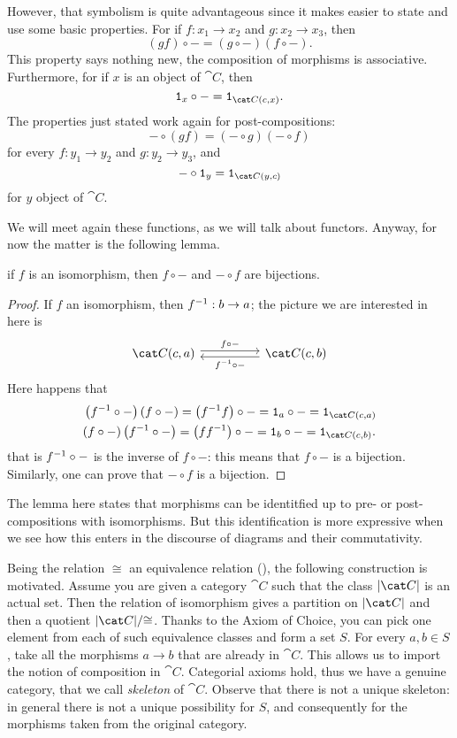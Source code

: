 However, that symbolism is quite advantageous since it makes easier to
state and use some basic properties. For if \(f : x_1 \to x_2\) and
\(g : x_2 \to x_3\), then
\[(gf) \circ - = (g \circ -) (f \circ -) .\] This property says nothing new, the
composition of morphisms is associative. Furthermore, for if \(x\) is
an object of \(\cat C\), then
\[\id_x \circ - = \id_{\cat C (c, x)} .\]
The properties just stated work again for post-compositions:
\[- \circ (gf) = (- \circ g) (- \circ f)\] for every
\(f : y_1 \to y_2\) and \(g : y_2 \to y_3\), and
\[- \circ \id_y = \id_{\cat C (y, c)}\] for \(y\) object of \(\cat C\).

We will meet again these functions, as we will talk about
functors. Anyway, for now the matter is the following lemma.

\begin{lemma}
  if \(f\) is an isomorphism, then \(f \circ -\) and \(- \circ f\) are
  bijections.
\end{lemma}

\begin{proof}
  If \(f\) an isomorphism, then \(f^{-1} : b \to a\); the picture we are
  interested in here is
  \[\begin{tikzcd}
      \cat C (c, a) \ar["{f \circ -}", rr, shift left] & & \cat C (c, b)
      \ar["{\inv f \circ -}", ll, shift left]
    \end{tikzcd}\] Here happens that
  \begin{align*}
    & \left(\inv f \circ -\right) (f \circ -) = \left(\inv f f\right) \circ - = \id_a \circ - = \id_{\cat C (c, a)} \\
    & (f \circ -) \left(\inv f \circ -\right) = \left(f \inv f\right) \circ - = \id_b \circ - = \id_{\cat C (c, b)} .
  \end{align*}
  that is \(f^{-1} \circ -\) is the inverse of \(f \circ -\): this means that
  \(f \circ -\) is a bijection. Similarly, one can prove that
  \(- \circ f\) is a bijection.
\end{proof}

The lemma here states that morphisms can be identitfied up to pre- or
post-compositions with isomorphisms. But this identification is more
expressive when we see how this enters in the discourse of diagrams
and their commutativity. 

Being the relation \(\cong\) an equivalence relation
(), the following construction is
motivated. Assume you are given a category \(\cat C\) such that the
class \(\obj{\cat C}\) is an actual set. Then the relation of
isomorphism gives a partition on \(\obj{\cat C}\) and then a quotient
\({\obj{\cat C}}{/}{\cong}\). Thanks to the Axiom of Choice, you can pick
one element from each of such equivalence classes and form a set
\(S\). For every \(a, b \in S\), take all the morphisms \(a \to b\) that
are already in \(\cat C\). This allows us to import the notion of
composition in \(\cat C\). Categorial axioms hold, thus we have a
genuine category, that we call {\em skeleton} of \(\cat C\). Observe
that there is not a unique skeleton: in general there is not a unique
possibility for \(S\), and consequently for the morphisms taken from
the original category.


